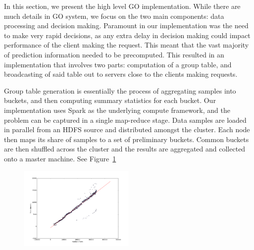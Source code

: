 
In this section, we present the high level GO implementation. While there are much details in GO system, we focus on the two main components: data processing and decision making. Paramount in our implementation was the need to make very rapid decisions, as any extra delay in decision making could impact performance of the client making the request. This meant that the vast majority of prediction information needed to be precomputed. This resulted in an implementation that involves two parts: computation of a group table, and broadcasting of said table out to servers close to the clients making requests.



 Group table generation is essentially the process of aggregating samples into buckets, and then computing summary statistics for each bucket.  Our implementation uses Spark as the underlying compute framework, and the problem can be captured in a single map-reduce stage. Data samples are loaded in parallel from an HDFS source and distributed amongst the cluster. Each node then maps its share of samples to a set of preliminary buckets. Common buckets are then shuffled across the cluster and the results are aggregated and collected onto a master machine. See Figure~\ref{fig:computing-scale}

\begin{figure}[h!]
\centering
 \includegraphics[width=0.5\textwidth] {figures/scale/fetch_time_scale.pdf}
\label{fig:computing-scale}
\end{figure}

